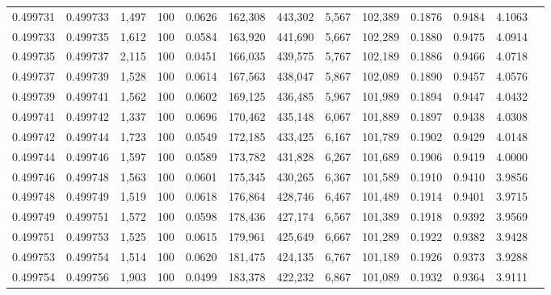 \begin{tabular}{rrrrrrrrrrrrr}
0.499731 & 0.499733 & 1,497 & 100 &                                     0.0626 & 162,308 & 443,302 &   5,567 & 102,389 & 0.1876 & 0.9484 & 4.1063 \\
0.499733 & 0.499735 & 1,612 & 100 &                                     0.0584 & 163,920 & 441,690 &   5,667 & 102,289 & 0.1880 & 0.9475 & 4.0914 \\
0.499735 & 0.499737 & 2,115 & 100 &                                     0.0451 & 166,035 & 439,575 &   5,767 & 102,189 & 0.1886 & 0.9466 & 4.0718 \\
0.499737 & 0.499739 & 1,528 & 100 &                                     0.0614 & 167,563 & 438,047 &   5,867 & 102,089 & 0.1890 & 0.9457 & 4.0576 \\
0.499739 & 0.499741 & 1,562 & 100 &                                     0.0602 & 169,125 & 436,485 &   5,967 & 101,989 & 0.1894 & 0.9447 & 4.0432 \\
0.499741 & 0.499742 & 1,337 & 100 &                                     0.0696 & 170,462 & 435,148 &   6,067 & 101,889 & 0.1897 & 0.9438 & 4.0308 \\
0.499742 & 0.499744 & 1,723 & 100 &                                     0.0549 & 172,185 & 433,425 &   6,167 & 101,789 & 0.1902 & 0.9429 & 4.0148 \\
0.499744 & 0.499746 & 1,597 & 100 &                                     0.0589 & 173,782 & 431,828 &   6,267 & 101,689 & 0.1906 & 0.9419 & 4.0000 \\
0.499746 & 0.499748 & 1,563 & 100 &                                     0.0601 & 175,345 & 430,265 &   6,367 & 101,589 & 0.1910 & 0.9410 & 3.9856 \\
0.499748 & 0.499749 & 1,519 & 100 &                                     0.0618 & 176,864 & 428,746 &   6,467 & 101,489 & 0.1914 & 0.9401 & 3.9715 \\
0.499749 & 0.499751 & 1,572 & 100 &                                     0.0598 & 178,436 & 427,174 &   6,567 & 101,389 & 0.1918 & 0.9392 & 3.9569 \\
0.499751 & 0.499753 & 1,525 & 100 &                                     0.0615 & 179,961 & 425,649 &   6,667 & 101,289 & 0.1922 & 0.9382 & 3.9428 \\
0.499753 & 0.499754 & 1,514 & 100 &                                     0.0620 & 181,475 & 424,135 &   6,767 & 101,189 & 0.1926 & 0.9373 & 3.9288 \\
0.499754 & 0.499756 & 1,903 & 100 &                                     0.0499 & 183,378 & 422,232 &   6,867 & 101,089 & 0.1932 & 0.9364 & 3.9111 \\

\end{tabular}
